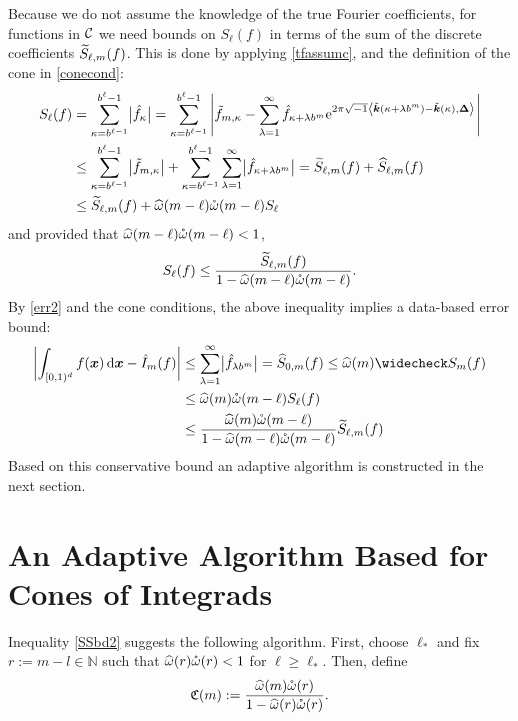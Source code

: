 \documentclass[graybox]{svmult}
\newcommand{\N}{\mathbb{N}} %
\newcommand{\bsx}{\boldsymbol{x}}    %
\newcommand{\bsDelta}{\boldsymbol{\Delta}}    %
\begin{document}
Because we do not assume the knowledge of the true  Fourier  coefficients, for functions in $\mathcal{C}$ we need bounds on $S_{\ell}(f)$ in terms of the sum of the discrete coefficients $\widetilde{S}_{\ell,m}(f)$.  This is done by applying \eqref{tfassumc},  and the definition of the cone in \eqref{conecond}:
\begin{align}
\nonumber
S_\ell(f) &= \sum_{\kappa=b^{\ell-1}}^{b^{\ell}-1} \bigl \lvert \hf_{\kappa}\bigr\rvert= \sum_{\kappa=b^{\ell-1}}^{b^{\ell}-1} \abs{\tf_{m,\kappa} - \sum_{\lambda=1}^{\infty} \hf_{\kappa+\lambda b^{m}} \E^{2 \pi \sqrt{-1} \ip{\tvk(\kappa+\lambda b^{m}) - \tvk(\kappa)}{\bsDelta}}}\\
\nonumber
&\le \sum_{\kappa=b^{\ell-1}}^{b^{\ell}-1} \bigl \lvert \tf_{m,\kappa} \bigr\rvert + \sum_{\kappa=b^{\ell-1}}^{b^{\ell}-1} \sum_{\lambda=1}^{\infty} \bigl \lvert \hf_{\kappa+\lambda b^{m}}\bigr\rvert = \tS_{\ell,m}(f) + \hS_{\ell,m}(f) \\
\label{boundSumbsApproxa}
&\le \tS_{\ell,m}(f) + \homega(m-\ell) \wcomega(m-\ell) S_\ell\
\end{align}
and provided that $\widehat{\omega}(m-\ell) \mathring{\omega}(m-\ell)<1$,
\begin{equation}\label{boundSumsApproxb}
S_\ell(f) \le \frac{\tS_{\ell,m}(f)}{1 - \homega(m-\ell) \wcomega(m-\ell)}.
\end{equation}
By \eqref{err2} and the cone conditions, the above inequality implies a data-based error bound:
\begin{align}
\nonumber
\biggabs{\int_{\cube} f(\bsx) \, \D \bsx - \hI_m(f) }
&\le \sum_{\lambda=1}^{\infty} \bigabs{\hf_{\lambda b^{m}}} 
= \hS_{0,m}(f)\le \homega(m) \wcS_m(f)\\
\nonumber
&  \le \homega(m) \wcomega(m-\ell) S_\ell(f)\\
& \le  \frac{\homega(m) \wcomega(m-\ell)}{1 - \homega(m-\ell) \wcomega(m-\ell)}\tS_{\ell,m}(f)
\label{SSbd2}
\end{align}
Based on this conservative bound an adaptive algorithm is constructed in the next section. 

\section{An Adaptive Algorithm Based for Cones of Integrads}\label{algorithmsection}

Inequality \eqref{SSbd2} suggests the following algorithm. First, choose $\ell_*$ and fix $r:=m-l \in \N$ such that $\widehat{\omega}(r)\mathring{\omega}(r)<1$ for $\ell\geq\ell_*$. Then, define
\[
\mathfrak{C}(m):= \frac{\widehat{\omega}(m) \mathring{\omega}(r)}{1 - \widehat{\omega}(r) \mathring{\omega}(r)}.
\]
\end{document}
